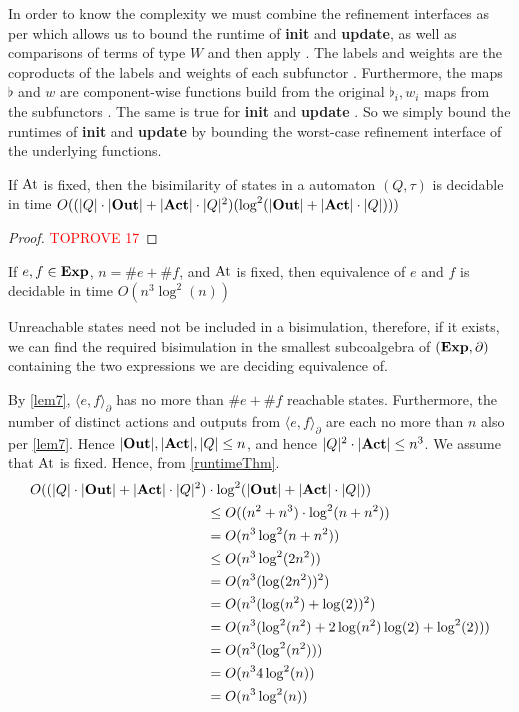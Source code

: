 \documentclass[a4paper,UKenglish,cleveref, autoref, thm-restate]{lipics-v2021}
\newcommand{\Out}{\textbf{\upshape{Out}}}
\newcommand{\Act}{\textbf{\upshape{Act}}}
\newcommand{\At}{\text{\upshape{At}}}
\newcommand{\Exp}{\textbf{\upshape{Exp}}}
\newcommand{\wgkat}{\textsf{\upshape{wGKAT}}\xspace}
\theoremstyle{plain}\newtheoremrep{thm}{Theorem}[section]
\begin{document}
\begin{toappendix}
		In order to know the complexity we must combine the refinement interfaces as per \cite[8.18]{wissmann2020efficient} which allows us to bound the runtime of \textbf{init} and \textbf{update}, as well as comparisons of terms of type $W$ and then apply \cite[Theorem 3.4]{10.1007/978-3-030-30942-8_18}. The labels and weights are the coproducts of the labels and weights of each subfunctor \cite[8.18]{wissmann2020efficient}. Furthermore, the maps $\flat$ and $w$ are component-wise functions build from the original $\flat_i, w_i$ maps from the subfunctors \cite[8.18]{wissmann2020efficient}. The same is true for \textbf{init} and \textbf{update} \cite[8.18]{wissmann2020efficient}. So we simply bound the runtimes of \textbf{init} and \textbf{update} by bounding the worst-case refinement interface of the underlying functions.
		
		\begin{thm}
			If $\At$ is fixed, then the bisimilarity of states in a \wgkat automaton $(Q, \tau)$ is decidable in time $O((|Q|\cdot|\Out|+|\Act|\cdot|Q|^2)(\log^2(|\Out|+|\Act|\cdot|Q|)))$  \label{runtimeThm}
		\end{thm}
		\begin{proof}\textcolor{red}{TOPROVE 17}\end{proof}
		\end{toappendix}
		\begin{correp}[Decidability]
			If $e, f \in \Exp$, $n = \# e + \# f$, and $\At$ is fixed, then \wgkat equivalence of $e$ and $f$ is decidable in time $O(n^3\log^2(n))$ \label{runtime}
		\end{correp}
		\begin{appendixproof}
			Unreachable states need not be included in a bisimulation, therefore, if it exists, we can find the required bisimulation in the smallest subcoalgebra of $(\Exp, \partial)$ containing the two expressions we are deciding equivalence of.
			
			By \cref{lem7}, $\langle e, f\rangle_\partial$ has no more than $\# e + \# f$ reachable states. Furthermore, the number of distinct actions and outputs from $\langle e, f\rangle_\partial$ are each no more than $n$ also per \cref{lem7}. Hence $|\Out|, |\Act|, |Q| \leq n$, and hence $|Q|^2\cdot|\Act| \leq n^3$. We assume that $\At$ is fixed. Hence, from \cref{runtimeThm}. 
			\begin{align*}
				O((|Q|\cdot|\Out|+|\Act|\cdot|Q|^2)&\cdot\log^2 (|\Out|+|\Act|\cdot|Q|))\\ 
				&\leq O((n^2+n^3)\cdot\log^2 (n+n^2))\\
				&= O(n^3\log^2 (n+n^2))\\
				&\leq O(n^3\log^2 (2n^2))\\
				&= O(n^3(\log(2n^2))^2)\\
				&= O(n^3(\log(n^2)+\log(2))^2)\\
				&= O(n^3(\log^2(n^2)+2\log(n^2)\log(2)+\log^2(2)))\\
				&= O(n^3(\log^2(n^2)))\\
				&= O(n^34\log^2(n))\\
				&= O(n^3\log^2(n))\rlap{\qedhere} 
			\end{align*}
		\end{appendixproof}
\end{document}
